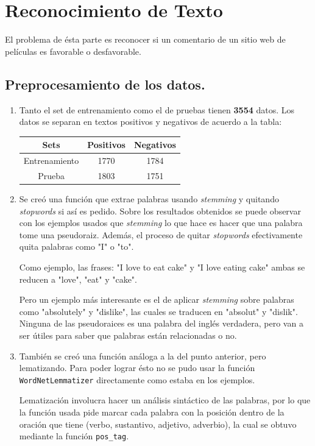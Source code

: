 \documentclass[11pt,letterpaper]{article}
\begin{document}
\section{Reconocimiento de Texto}
\label{sec:orgheadline4}
El problema de ésta parte es reconocer si un comentario de un sitio web de
películas es favorable o desfavorable.
\subsection{Preprocesamiento de los datos.}
\label{sec:orgheadline2}
\begin{enumerate}
\item Tanto el set de entrenamiento como el de pruebas tienen \textbf{3554} datos.
Los datos se separan en textos positivos y negativos de acuerdo a la tabla:
\begin{center}
\begin{tabular}{|c|c|c|}
\hline
Sets & Positivos & Negativos\\
\hline
Entrenamiento & 1770 & 1784\\
Prueba & 1803 & 1751\\
\hline
\end{tabular}
\end{center}
\item Se creó una función que extrae palabras usando \emph{stemming} y quitando
\emph{stopwords} si así es pedido. Sobre los resultados obtenidos se puede
observar con los ejemplos usados que \emph{stemming} lo que hace es hacer que
una palabra tome una pseudoraiz. Además, el proceso de quitar \emph{stopwords}
efectivamente quita palabras como "I" o "to".

Como ejemplo, las frases: "I love to eat cake" y "I love eating cake" ambas
se reducen a "love", "eat" y "cake".

Pero un ejemplo más interesante es el de aplicar \emph{stemming} sobre palabras
como "absolutely" y "dislike", las cuales se traducen en "absolut" y
"dislik". Ninguna de las pseudoraices es una palabra del inglés verdadera,
pero van a ser útiles para saber que palabras están relacionadas o no.
\item También se creó una función análoga a la del punto anterior, pero
lematizando. Para poder lograr ésto no se pudo usar la función
\texttt{WordNetLemmatizer} directamente como estaba en los ejemplos.

Lematización involucra hacer un análisis sintáctico de las palabras, por lo
que la función usada pide marcar cada palabra con la posición dentro de la
oración que tiene (verbo, sustantivo, adjetivo, adverbio), la cual se
obtuvo mediante la función \texttt{pos\_tag}.


\end{enumerate}
\end{document}
